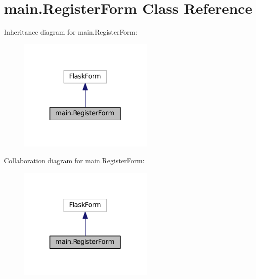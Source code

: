 \hypertarget{classmain_1_1RegisterForm}{}\section{main.\+Register\+Form Class Reference}
\label{classmain_1_1RegisterForm}


Inheritance diagram for main.\+Register\+Form\+:\nopagebreak
\begin{figure}[H]
\begin{center}
\leavevmode
\includegraphics[width=187pt]{classmain_1_1RegisterForm__inherit__graph}
\end{center}
\end{figure}


Collaboration diagram for main.\+Register\+Form\+:\nopagebreak
\begin{figure}[H]
\begin{center}
\leavevmode
\includegraphics[width=187pt]{classmain_1_1RegisterForm__coll__graph}
\end{center}
\end{figure}
